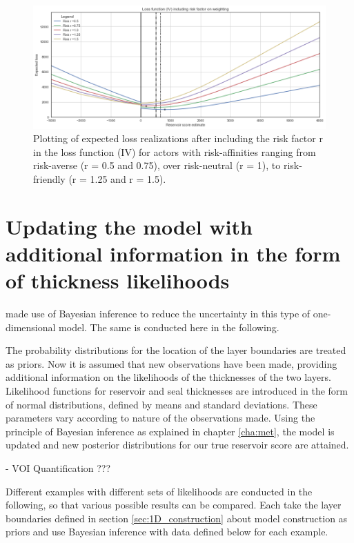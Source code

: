 	\begin{figure}[h]
		\centering
		\includegraphics[width=1\textwidth]{Figures/LFR.png}
		\caption{Plotting of expected loss realizations after including the risk factor r in the loss function (IV) for actors with risk-affinities ranging from risk-averse (r = 0.5 and 0.75), over risk-neutral (r = 1), to risk-friendly (r = 1.25 and r = 1.5).}\label{fig:LFR} 
	\end{figure}
	
	\section{Updating the model with additional information in the form of thickness likelihoods}
	
	\citet{delaVarga2016} made use of Bayesian inference to reduce the uncertainty in this type of one-dimensional model. The same is conducted here in the following.
	
	The probability distributions for the location of the layer boundaries are treated as priors. Now it is assumed that new observations have been made, providing additional information on the likelihoods of the thicknesses of the two layers. Likelihood functions for reservoir and seal thicknesses are introduced in the form of normal distributions, defined by means and standard deviations. These parameters vary according to nature of the observations made. Using the principle of Bayesian inference as explained in chapter \ref{cha:met}, the model is updated and new posterior distributions for our true reservoir score are attained.
	
	- VOI Quantification ???
	
	Different examples with different sets of likelihoods are conducted in the following, so that various possible results can be compared. Each take the layer boundaries defined in section \ref{sec:1D_construction} about model construction as priors and use Bayesian inference with data defined below for each example.
	
